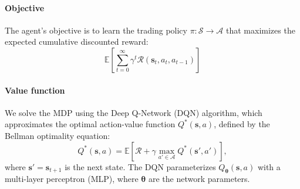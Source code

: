 \paragraph{Objective}
The agent's objective is to learn the trading policy $\pi : \mathcal{S} \to \mathcal{A}$ that maximizes the expected cumulative discounted reward:
\begin{equation*}
    \mathbb{E} \left[ \sum_{t=0}^\infty \gamma^t \mathcal R(\mathbf s_t, a_t, a_{t-1}) \right]
\end{equation*}

\paragraph{Value function}

We solve the MDP using the Deep Q-Network (DQN) algorithm, 
which approximates the optimal action-value function $Q^*(\mathbf{s}, a)$, 
defined by the Bellman optimality equation:
\begin{equation*}
    Q^*(\mathbf{s}, a) = \mathbb{E} \left[ \mathcal{R} + \gamma \max_{a' \in \mathcal{A}} Q^*(\mathbf{s}', a') \right],
\end{equation*}
where $\mathbf{s}' = \mathbf{s}_{t+1}$ is the next state. 
The DQN parameterizes $Q_{\boldsymbol{\theta}}(\mathbf{s}, a)$ with a multi-layer perceptron (MLP),
 where $\boldsymbol{\theta}$ are the network parameters. 



